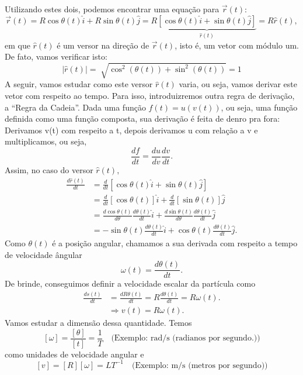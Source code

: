 \documentclass{article}
\begin{document}
  Utilizando estes dois, podemos encontrar uma equa\c c\~ao para $\vec{r}(t)$: 
    $$
    \vec{r}(t) = R\cos{\theta(t)}\hat{i} + R\sin{\theta(t)}\hat{j} = R\underbrace{[\cos{\theta(t)}\hat{i} + \sin{\theta(t)}\hat{j}]}_{\hat{r}(t)}
= R\hat{r}(t),
    $$
    em que $\hat{r}(t)$ \'e um versor na dire\c c\~ao de $\vec{r}(t)$, isto \'e, um vetor com m\'odulo um. De fato, vamos verificar isto: 
    $$
    |\hat{r}(t)| = \sqrt[]{\cos^{2}(\theta(t)) + \sin^{2}(\theta(t))} = 1
    $$
    A seguir, vamos estudar como este versor $\hat{r}(t)$ varia, ou seja, vamos derivar este vetor com respeito ao tempo. Para isso,
  introduizremos outra regra de deriva\c c\~ao, a ``Regra da Cadeia''. Dada uma fun\c c\~ao $f(t) = u(v(t))$, ou seja, uma fun\c c\~ao
  definida como uma fun\c c\~ao composta, sua deriva\c c\~ao \'e feita de denro pra fora: Derivamos v(t) com respeito a t, depois derivamos
  u com rela\c c\~ao a v e multiplicamos, ou seja, 
    $$
    \boxed{\frac{df}{dt} = \frac{du}{dv}\frac{dv}{dt}}.
    $$
    Assim, no caso do versor $\hat{r}(t),$ 
    \begin{align*}
      \frac{d\hat{r}(t)}{dt} &= \frac{d}{dt}[\cos{\theta(t)}\hat{i} + \sin{\theta(t)}\hat{j}]\\
                             &= \frac{d}{dt}[\cos{\theta(t)}]\hat{i} + \frac{d}{dt}[\sin{\theta(t)}]\hat{j}\\
                             &= \frac{d\cos{\theta(t)}}{d\theta}\frac{d\theta(t)}{dt}\hat{i} + \frac{d\sin{\theta(t)}}{d\theta}\frac{d\theta(t)}{dt}\hat{j}\\
                             &= -\sin{\theta(t)}\frac{d\theta(t)}{dt}\hat{i} + \cos{\theta(t)}\frac{d\theta(t)}{dt}\hat{j}.
    \end{align*}
    Como $\theta(t)$ \'e a posi\c c\~ao angular, chamamos a sua derivada com respeito a tempo de velocidade \^angular 
      $$
      \boxed{\omega(t) = \frac{d\theta(t)}{dt}.}
      $$
    De brinde, conseguimos definir a velocidade escalar da part\'icula como 
   \begin{align*}
      \frac{ds(t)}{dt} &= \frac{dR\theta(t)}{dt} = R \frac{d\theta(t)}{dt} = R\omega(t).\\
      &\Rightarrow \boxed{v(t) = R\omega(t).}
   \end{align*}
   Vamos estudar a dimens\~ao dessa quantidade. Temos 
     $$
     [\omega] = \frac{[\theta]}{[t]} = \frac{1}{T} \quad \text{(Exemplo: rad/s (radianos por segundo.))}
     $$ 
    como unidades de velocidade angular e 
      $$
        [v] = [R][\omega] = LT^{-1} \quad \text{(Exemplo: m/s (metros por segundo))}
      $$
\end{document}
